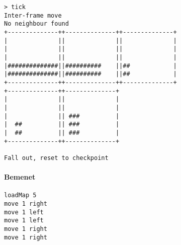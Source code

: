 \begin{verbatim}
> tick
Inter-frame move
No neighbour found
+--------------++--------------++--------------+
|              ||              ||              |
|              ||              ||              |
|              ||              ||              |
|##############||##########    ||##            |
|##############||##########    ||##            |
+--------------++--------------++--------------+
+--------------++--------------+                
|              ||              |                
|              ||              |                
|              || ###          |                
|  ##          || ###          |                
|  ##          || ###          |                
+--------------++--------------+                

Fall out, reset to checkpoint
\end{verbatim}
		        
		        \paragraph*{Bemenet}
\begin{verbatim}
loadMap 5
move 1 right
move 1 left
move 1 left
move 1 right
move 1 right
\end{verbatim}
